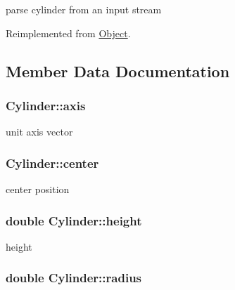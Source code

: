 parse cylinder from an input stream 



Reimplemented from \hyperlink{structObject_ae7828b080c96e2226f3dc19823161d41}{Object}.



\subsection{Member Data Documentation}
\subsubsection[{\texorpdfstring{axis}{axis}}]{ Cylinder\+::axis\hspace{0.3cm}{\ttfamily [private]}}\hypertarget{classCylinder_a82b22d56b3affae2163dfb474d206227}{}\label{classCylinder_a82b22d56b3affae2163dfb474d206227}


unit axis vector 

\subsubsection[{\texorpdfstring{center}{center}}]{ Cylinder\+::center\hspace{0.3cm}{\ttfamily [private]}}\hypertarget{classCylinder_a50180f95904cab9cc52c7ebb25aa3ea2}{}\label{classCylinder_a50180f95904cab9cc52c7ebb25aa3ea2}


center position 

\subsubsection[{\texorpdfstring{height}{height}}]{\setlength{\rightskip}{0pt plus 5cm}double Cylinder\+::height\hspace{0.3cm}{\ttfamily [private]}}\hypertarget{classCylinder_a211cebc37f1025850cdacffe1badb578}{}\label{classCylinder_a211cebc37f1025850cdacffe1badb578}


height 

\subsubsection[{\texorpdfstring{radius}{radius}}]{\setlength{\rightskip}{0pt plus 5cm}double Cylinder\+::radius\hspace{0.3cm}{\ttfamily [private]}}\hypertarget{classCylinder_a8a825799285bcf60b49b8aef0459b498}{}\label{classCylinder_a8a825799285bcf60b49b8aef0459b498}


